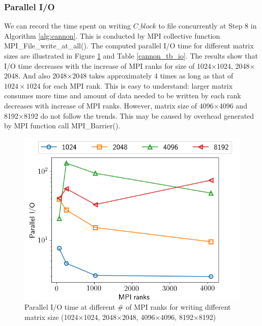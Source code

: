 \documentclass[conference]{IEEEtran}
\begin{document}
\subsubsection{Parallel I/O}
We can record the time spent on writing $C\_block$ to file concurrently at Step 8 in Algorithm \ref{alg:cannon}. This is conducted by MPI collective function MPI\_File\_write\_at\_all(). The computed parallel I/O time for different matrix sizes are illustrated in Figure \ref{cannon_io} and Table \ref{cannon_tb_io}. The results show that I/O time decreases with the increase of MPI ranks for size of 1024$\times$1024, 2048$\times$2048. And also 2048$\times$2048 takes approximately 4 times as long as that of $1024\times1024$ for each MPI rank. This is easy to understand: larger matrix consumes more time and amount of data needed to be written by each rank decreases with increase of MPI ranks. However, matrix size of 4096$\times$4096 and 8192$\times$8192 do not follow the trends. This may be caused by overhead generated by MPI function call MPI\_Barrier(). 
\begin{figure}[!h]
    \centering
    \includegraphics[scale=0.4]{Figures/cannon/io.png}
    \caption{ Parallel I/O time at different \# of MPI ranks for writing different matrix size (1024$\times$1024, 2048$\times$2048, 4096$\times$4096, 8192$\times$8192)}
    \label{cannon_io}
\end{figure}
\end{document}

